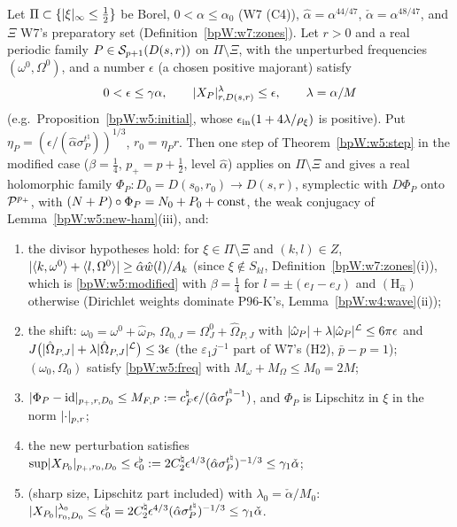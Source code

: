 \begin{lemma}\label{bpW:w6:prep-step}
Let $\Pi\subset\{\lvert \xi\rvert_\infty\le\frac12\}$ be Borel, $0<\alpha\le\alpha_0$ (W7 (C4)), $\hat\alpha=\alpha^{44/47}$,
$\check\alpha=\alpha^{48/47}$, and $\Xi$ W7's preparatory set (Definition~\ref{bpW:w7:zones}). Let $r>0$ and a real periodic family
$P\in\mathcal S_{p+1}(D(s,r))$ on $\Pi\setminus\Xi$, with the unperturbed frequencies $(\omega^0,\Omega^0)$, and a number
$\epsilon$ (a chosen positive majorant) satisfy
\[0<\epsilon\le\gamma\alpha,\qquad\lvert X_P\rvert^\lambda_{r,D(s,r)}\le\epsilon,\qquad\lambda=\alpha/M\]
(e.g.\ Proposition~\ref{bpW:w5:initial}, whose $\epsilon_{\rm in}(1+4\lambda/\rho_\xi)$ is positive). Put
$\eta_P=(\epsilon/(\hat\alpha\sigma_P^{t^\natural}))^{1/3}$, $r_0=\eta_Pr$. Then one step of Theorem~\ref{bpW:w5:step} in the modified case
($\beta=\frac14$, $p_+=p+\frac12$, level $\hat\alpha$) applies on $\Pi\setminus\Xi$ and gives a real holomorphic family
$\Phi_P:D_0=D(s_0,r_0)\to D(s,r)$, symplectic with $D\Phi_P$ onto $\mathcal P^{p_+}$, with $(N+P)\circ\Phi_P=N_0+P_0+{\rm const}$, the weak
conjugacy of Lemma~\ref{bpW:w5:new-ham}(iii), and:
\begin{enumerate}[label=(\roman*)]
\item the divisor hypotheses hold: for $\xi\in\Pi\setminus\Xi$ and $(k,l)\in Z$,
  $\lvert \langle k,\omega^0\rangle+\langle l,\Omega^0\rangle\rvert\ge\hat\alpha\hat w(l)/A_k$ (since $\xi\notin S_{kl}$, Definition~\ref{bpW:w7:zones}(i)), which is
  \eqref{bpW:w5:modified} with $\beta=\frac14$ for $l=\pm(e_I-e_J)$ and $(\mathrm H_{\hat\alpha})$ otherwise (Dirichlet weights dominate
  P96-K's, Lemma~\ref{bpW:w4:wave}(ii));
\item the shift: $\omega_0=\omega^0+\hat\omega_P$, $\Omega_{0,J}=\Omega^0_J+\hat\Omega_{P,J}$ with $\lvert \hat\omega_P\rvert+\lambda\lvert \hat\omega_P\rvert^{\mathcal L}\le6\pi\epsilon$ and
  $J\bigl(\lvert \hat\Omega_{P,J}\rvert+\lambda\lvert \hat\Omega_{P,J}\rvert^{\mathcal L}\bigr)\le3\epsilon$ (the $\varepsilon_1j^{-1}$ part of W7's (H2), $\bar p-p=1$);
  $(\omega_0,\Omega_0)$ satisfy \eqref{bpW:w5:freq} with $M_\omega+M_\Omega\le M_0=2M$;
\item $\lvert \Phi_P-\mathrm{id}\rvert_{p_+,r,D_0}\le M_{F,P}:=c^\natural_F\epsilon/(\hat\alpha\sigma_P^{t^\natural-1})$, and $\Phi_P$ is Lipschitz in $\xi$ in the norm
  $\lvert \cdot\rvert_{p,r}$;
\item the new perturbation satisfies $\sup\lvert X_{P_0}\rvert_{p_+,r_0,D_0}\le\epsilon^\flat_0:=2C^\natural_2\epsilon^{4/3}(\hat\alpha\sigma_P^{t^\natural})^{-1/3}\le\gamma_1\check\alpha$;
\item (sharp size, Lipschitz part included) with $\lambda_0=\check\alpha/M_0$:
  $\lvert X_{P_0}\rvert^{\lambda_0}_{r_0,D_0}\le\epsilon^\flat_0=2C^\natural_2\epsilon^{4/3}(\hat\alpha\sigma_P^{t^\natural})^{-1/3}\le\gamma_1\check\alpha$.
\end{enumerate}
\end{lemma}
